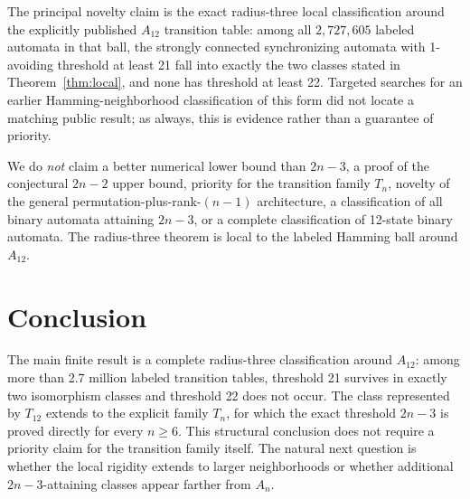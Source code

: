 \documentclass[11pt]{article}
\theoremstyle{definition}
\theoremstyle{remark}
\begin{document}
The principal novelty claim is the exact radius-three local classification around the explicitly published $A_{12}$ transition table: among all $2{,}727{,}605$ labeled automata in that ball, the strongly connected synchronizing automata with 1-avoiding threshold at least 21 fall into exactly the two classes stated in Theorem~\ref{thm:local}, and none has threshold at least 22. Targeted searches for an earlier Hamming-neighborhood classification of this form did not locate a matching public result; as always, this is evidence rather than a guarantee of priority.

We do \emph{not} claim a better numerical lower bound than $2n-3$, a proof of the conjectural $2n-2$ upper bound, priority for the transition family $T_n$, novelty of the general permutation-plus-rank-$(n-1)$ architecture, a classification of all binary automata attaining $2n-3$, or a complete classification of 12-state binary automata. The radius-three theorem is local to the labeled Hamming ball around $A_{12}$.

\section{Conclusion}
The main finite result is a complete radius-three classification around $A_{12}$: among more than 2.7 million labeled transition tables, threshold 21 survives in exactly two isomorphism classes and threshold 22 does not occur. The class represented by $T_{12}$ extends to the explicit family $T_n$, for which the exact threshold $2n-3$ is proved directly for every $n\ge6$. This structural conclusion does not require a priority claim for the transition family itself. The natural next question is whether the local rigidity extends to larger neighborhoods or whether additional $2n-3$-attaining classes appear farther from $A_n$.
\end{document}
